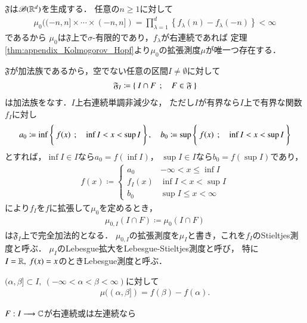 	$\mathfrak{F}$は$\mathscr{B}(\mathbb{R}^d)$を生成する．
	任意の$n \geq 1$に対して
	\begin{align}
		\mu_0((-n,n] \times \cdots \times (-n,n]) 
		= \prod_{\lambda=1}^d \left\{f_\lambda(n) - f_\lambda(-n)\right\} < \infty
	\end{align}
	であるから
	$\mu_0$は$\mathfrak{F}$上で$\sigma$-有限的であり，$f_\lambda$が右連続であれば
	定理\ref{thm:appendix_Kolmogorov_Hopf}より$\mu_0$の拡張測度$\mu$が唯一つ存在する．
	
	$\mathfrak{F}$が加法族であるから，空でない任意の区間$I \neq \emptyset$に対して
	\begin{align}
		\mathfrak{F}_I \coloneqq \left\{\ I \cap F\ \, ; \quad F \in \mathfrak{F}\ \right\}
	\end{align}
	は加法族をなす．$I$上右連続単調非減少な，
	ただし$I$が有界なら$I$上で有界な関数$f_I$に対し
	\begin{align}
		a_0 \coloneqq \operatorname*{inf}_{} \left\{\ f(x)\ \, ; \quad \operatorname*{inf}_{} I < x < \operatorname*{sup}_{} I\ \right\},
		\quad b_0 \coloneqq \operatorname*{sup}_{} \left\{\ f(x)\ \, ; \quad \operatorname*{inf}_{} I < x < \operatorname*{sup}_{} I\ \right\}
	\end{align}
	とすれば，$\inf{}{I} \in I$なら$a_0 = f(\inf{}{I})$，
	$\sup{}{I} \in I$なら$b_0 = f(\sup{}{I})$であり，
	\begin{align}
		f(x) \coloneqq 
		\begin{cases}
			a_0 & -\infty < x \leq \inf{}{I} \\
			f_I(x) & \inf{}{I} < x < \sup{}{I} \\
			b_0 & \sup{}{I} \leq x < \infty
		\end{cases}
	\end{align}
	により$f_I$を$f$に拡張して$\mu_0$を定めるとき，
	\begin{align}
		\mu_{0,I}(I \cap F) \coloneqq \mu_0(I \cap F)
	\end{align}
	は$\mathfrak{F}_I$上で完全加法的となる．
	$\mu_{0,I}$の拡張測度を$\mu_I$と書き，これを$f_I$のStieltjes測度と呼ぶ．
	$\mu_I$のLebesgue拡大をLebesgue-Stieltjes測度と呼び，
	特に$I = \mathbb{R},\ f(x) = x$のときLebesgue測度と呼ぶ．
	
	\begin{screen}
		\begin{thm}[左半開区間のStiletjes測度]
			$(\alpha,\beta] \subset I,\ (-\infty < \alpha < \beta < \infty)$に対して
			\begin{align}
				\mu((\alpha,\beta]) = f(\beta) - f(\alpha).
			\end{align}
		\end{thm}
	\end{screen}
	
	\begin{screen}
		\begin{thm}
			$F:I \longrightarrow \mathbb{C}$が右連続或は左連続なら
		\end{thm}
	\end{screen}
	
	\begin{screen}
		\begin{thm}[時間変更]
			
		\end{thm}
	\end{screen}